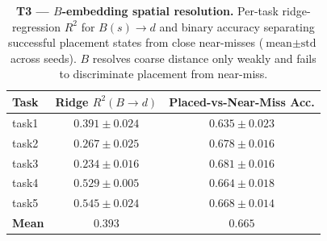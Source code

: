 \begin{table}[htbp]
\centering
\small
\caption{\textbf{T3 --- $B$-embedding spatial resolution.} Per-task
ridge-regression $R^2$ for $B(s)\to d$ and binary accuracy separating
successful placement states from close near-misses
($\text{mean}\pm\text{std}$ across seeds). $B$ resolves coarse distance
only weakly and fails to discriminate placement from near-miss.}
\label{tab:T3_b_resolution}
\vspace{0.5em}
\begin{tabular}{lcc}
\toprule
\textbf{Task} & \textbf{Ridge $R^2(B \to d)$} & \textbf{Placed-vs-Near-Miss Acc.} \\
\midrule
task1 & $0.391 \pm 0.024$ & $0.635 \pm 0.023$ \\
task2 & $0.267 \pm 0.025$ & $0.678 \pm 0.016$ \\
task3 & $0.234 \pm 0.016$ & $0.681 \pm 0.016$ \\
task4 & $0.529 \pm 0.005$ & $0.664 \pm 0.018$ \\
task5 & $0.545 \pm 0.024$ & $0.668 \pm 0.014$ \\
\midrule
\textbf{Mean} & $\mathbf{0.393}$ & $\mathbf{0.665}$ \\
\bottomrule
\end{tabular}
\end{table}
